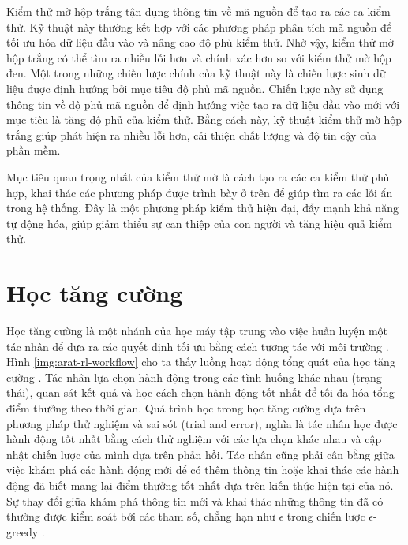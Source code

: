 
Kiểm thử mờ hộp trắng tận dụng thông tin về mã nguồn để tạo ra các ca kiểm thử. Kỹ thuật này thường kết hợp với các phương pháp phân tích mã nguồn để tối ưu hóa dữ liệu đầu vào và nâng cao độ phủ kiểm thử. Nhờ vậy, kiểm thử mờ hộp trắng có thể tìm ra nhiều lỗi hơn và chính xác hơn so với kiểm thử mờ hộp đen. Một trong những chiến lược chính của kỹ thuật này là chiến lược sinh dữ liệu được định hướng bởi mục tiêu độ phủ mã nguồn. Chiến lược này sử dụng thông tin về độ phủ mã nguồn để định hướng việc tạo ra dữ liệu đầu vào mới với mục tiêu là tăng độ phủ của kiểm thử. Bằng cách này, kỹ thuật kiểm thử mờ hộp trắng giúp phát hiện ra nhiều lỗi hơn, cải thiện chất lượng và độ tin cậy của phần mềm.

Mục tiêu quan trọng nhất của kiểm thử mờ là cách tạo ra các ca kiểm thử phù hợp, khai thác các phương pháp được trình bày ở trên để giúp tìm ra các lỗi ẩn trong hệ thống. Đây là một phương pháp kiểm thử hiện đại, đẩy mạnh khả năng tự động hóa, giúp giảm thiểu sự can thiệp của con người và tăng hiệu quả kiểm thử.



\section{Học tăng cường}

\label{sec:rnn}

Học tăng cường là một nhánh của học máy tập trung vào việc huấn luyện một tác nhân để đưa ra các quyết định tối ưu bằng cách tương tác với môi trường \cite{RL}. Hình \ref{img:arat-rl-workflow} cho ta thấy luồng hoạt động tổng quát của học tăng cường \cite{spiceworks_rl}. Tác nhân lựa chọn hành động trong các tình huống khác nhau (trạng thái), quan sát kết quả và học cách chọn hành động tốt nhất để tối đa hóa tổng điểm thưởng theo thời gian. Quá trình học trong học tăng cường dựa trên phương pháp thử nghiệm và sai sót (trial and error), nghĩa là tác nhân học được hành động tốt nhất bằng cách thử nghiệm với các lựa chọn khác nhau và cập nhật chiến lược của mình dựa trên phản hồi. Tác nhân cũng phải cân bằng giữa việc khám phá các hành động mới để có thêm thông tin hoặc khai thác các hành động đã biết mang lại điểm thưởng tốt nhất dựa trên kiến thức hiện tại của nó. Sự thay đổi giữa khám phá thông tin mới và khai thác những thông tin đã có thường được kiểm soát bởi các tham số, chẳng hạn như $\epsilon$ trong chiến lược $\epsilon$-greedy \cite{RL}.

